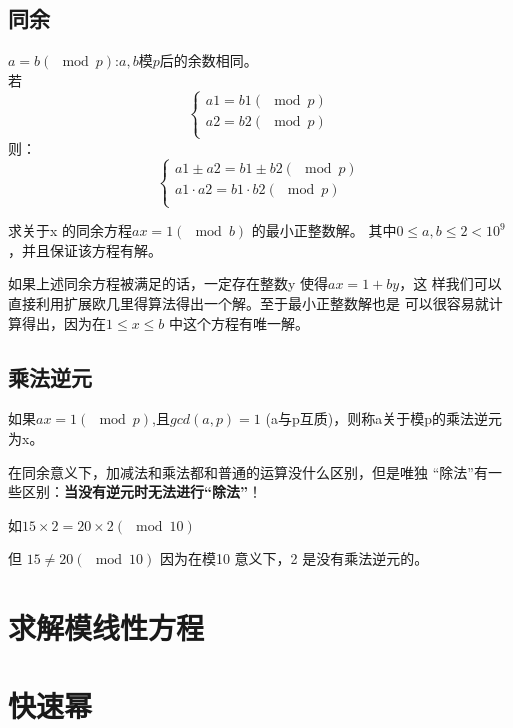 \documentclass[lang=cn,11pt]{elegantbook}
\begin{document}
	\subsection{同余}
	$a=b(\mod p)$:$a,b$模$p$后的余数相同。\\
	若\[
	\begin{cases}
	a1=b1(\mod p)\\
	a2=b2(\mod p)\\
	\end{cases}
	\]
	则：	\[
	\begin{cases}
	a1\pm a2=b1 \pm b2 (\mod p)\\
	a1\cdot a2=b1 \cdot b2 (\mod p)\\
	\end{cases}
	\]
	\begin{example}
	求关于x 的同余方程$ax =1 (\mod b)$ 的最小正整数解。
	其中$0 \leq a, b \leq 2<10^9$，并且保证该方程有解。
	
	如果上述同余方程被满足的话，一定存在整数y 使得$ax = 1+by$，这
	样我们可以直接利用扩展欧几里得算法得出一个解。至于最小正整数解也是
	可以很容易就计算得出，因为在$1 \leq x \leq b$ 中这个方程有唯一解。
\end{example}
	\subsection{乘法逆元}
	如果$ax=1 (\mod p)$,且$gcd(a,p)=1$ (a与p互质)，则称a关于模p的乘法逆元为x。
	
	在同余意义下，加减法和乘法都和普通的运算没什么区别，但是唯独
	“除法”有一些区别：\textbf{当没有逆元时无法进行“除法”}！
	
	如$15\times 2 = 20\times 2 (\mod 10)$
	
	但	$15\neq 20 (\mod 10)$
	因为在模10 意义下，2 是没有乘法逆元的。
	
	\section{求解模线性方程}
	\section{快速幂}
	
\end{document}
